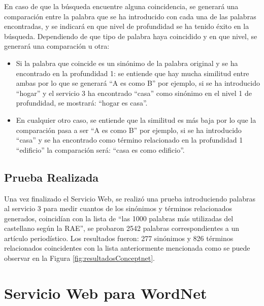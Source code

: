 En caso de que la búsqueda encuentre alguna coincidencia, se generará una comparación entre la palabra que se ha introducido con cada una de las palabras encontradas, y se indicará en que nivel de profundidad se ha tenido éxito en la búsqueda. Dependiendo de que tipo de palabra haya coincidido y en que nivel, se generará una comparación u otra:
\begin{itemize}
	\item Si la palabra que coincide es un sinónimo de la palabra original  y se ha encontrado en la profundidad 1: se entiende que hay mucha similitud entre ambas por lo que se generará ``A es como B'' por ejemplo, si se ha introducido ``hogar'' y el servicio 3 ha encontrado ``casa'' como sinónimo en el nivel 1 de profundidad, se mostrará: ``hogar es casa''.
	
	\item En cualquier otro caso, se entiende que la similitud es más baja por lo que la comparación pasa a ser ``A es como B'' por ejemplo, si se ha introducido ``casa'' y se ha encontrado como término relacionado en la profundidad 1 ``edificio'' la comparación será: ``casa es como edificio''.
\end{itemize}

\subsection{Prueba Realizada}
\label{cap:subsec:pruebaConceptnet}

Una vez finalizado el Servicio Web, se realizó una prueba introduciendo palabras al servicio 3 para medir cuantos de los sinónimos y términos relacionados generados, coincidían con la lista de ``las 1000 palabras más utilizadas del castellano según la RAE'', se probaron 2542 palabras correspondientes a un artículo periodístico. Los resultados fueron: 277 sinónimos y 826 términos relacionados coincidentes con la lista anteriormente mencionada como se puede observar en la Figura \ref{fig:resultadosConceptnet}.


\section{Servicio Web para WordNet}
\label{cap:sec:servicioWordnet}

